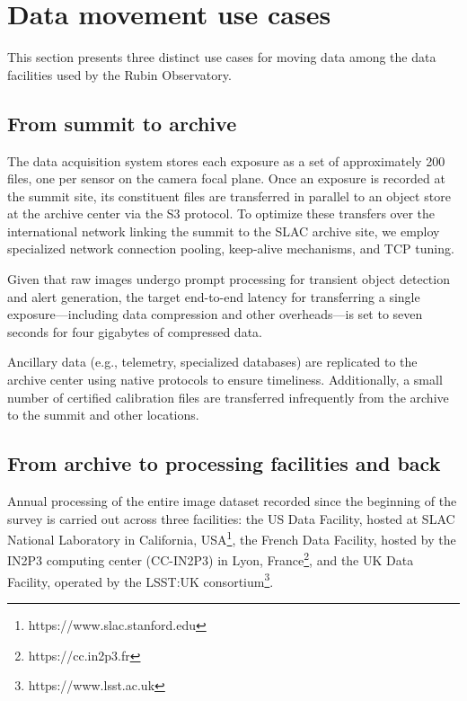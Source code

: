 \documentclass{webofc}
\begin{document}
\section{Data movement use cases}
\label{section-data-movement-use-cases}

This section presents three distinct use cases for moving data among the data facilities used by the Rubin Observatory.

\subsection{From summit to archive}
\label{summit-to-archive}

The data acquisition system stores each exposure as a set of approximately 200 files, one per sensor on the camera focal plane. Once an exposure is recorded at the summit site, its constituent files are transferred in parallel to an object store at the archive center via the S3 protocol. To optimize these transfers over the international network linking the summit to the SLAC archive site, we employ specialized network connection pooling, keep-alive mechanisms, and TCP tuning.

Given that raw images undergo prompt processing for transient object detection and alert generation, the target end-to-end latency for transferring a single exposure—including data compression and other overheads—is set to seven seconds for four gigabytes of compressed data.

Ancillary data (e.g., telemetry, specialized databases) are replicated to the archive center using native protocols to ensure timeliness. Additionally, a small number of certified calibration files are transferred infrequently from the archive to the summit and other locations.

\subsection{From archive to processing facilities and back}
\label{summit-to-data-facilities}

Annual processing of the entire image dataset recorded since the beginning of the survey is carried out across three facilities: the US Data Facility, hosted at SLAC National Laboratory in California, USA\footnote{https://www.slac.stanford.edu}, the French Data Facility, hosted by the IN2P3 computing center (CC-IN2P3) in Lyon, France\footnote{https://cc.in2p3.fr}, and the UK Data Facility, operated by the LSST:UK consortium\footnote{https://www.lsst.ac.uk}.
\end{document}
